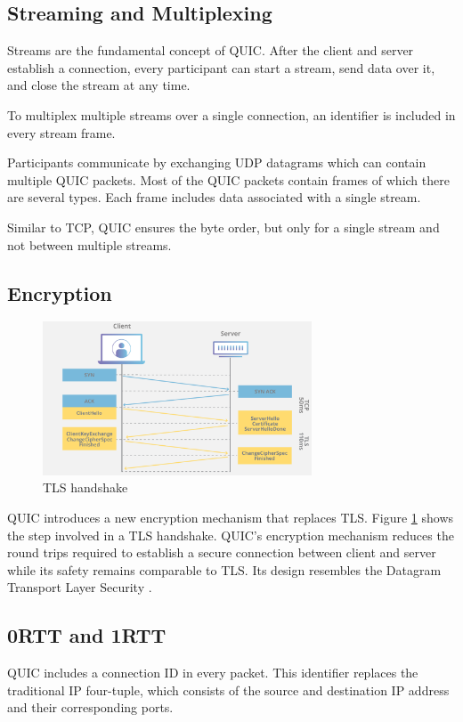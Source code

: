 \documentclass[conference]{IEEEtran}
\begin{document}
\subsection{Streaming and Multiplexing}

Streams are the fundamental concept of QUIC. After the client and server establish a connection, every participant can start a stream, send data over it, and close the stream at any time. 

To multiplex multiple streams over a single connection, an identifier is included in every stream frame.

Participants communicate by exchanging UDP datagrams which can contain multiple QUIC packets. Most of the QUIC packets contain frames of which there are several types. Each frame includes data associated with a single stream.

Similar to TCP, QUIC ensures the byte order, but only for a single stream and not between multiple streams.

\subsection{Encryption}

\begin{figure}[htbp]
\includegraphics[width=8cm,keepaspectratio]{images/TLS handshake.png}
\caption{TLS handshake \cite{CloudflareTlsHandshake}}
\label{fig:tls-handshake}
\end{figure}

QUIC introduces a new encryption mechanism that replaces TLS. Figure \ref{fig:tls-handshake} shows the step involved in a TLS handshake. QUIC's encryption mechanism reduces the round trips required to establish a secure connection between client and server while its safety remains comparable to TLS. Its design resembles the Datagram Transport Layer Security \cite{HowQuickIsQuic}.

\subsection{0RTT and 1RTT}
QUIC includes a connection ID in every packet. This identifier replaces the traditional IP four-tuple, which consists of the source and destination IP address and their corresponding ports.
\end{document}
